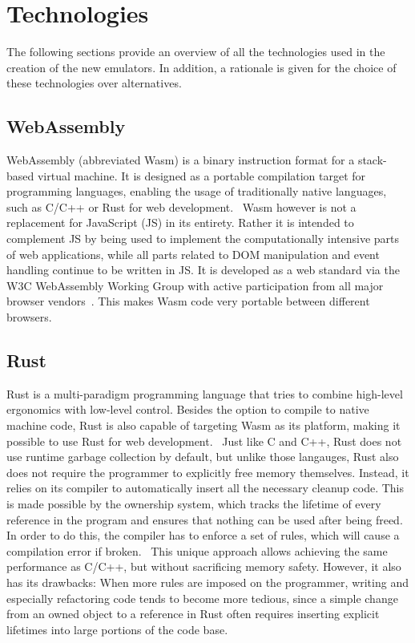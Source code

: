 \section {Technologies}
The following sections provide an overview of all the technologies used in the creation of the new emulators.
In addition, a rationale is given for the choice of these technologies over alternatives.

\subsection{WebAssembly}
WebAssembly (abbreviated Wasm) is a binary instruction format for a stack-based virtual machine. It is designed as a portable compilation target for programming languages, enabling the usage of traditionally native languages, such as C/C++ or Rust for web development.~\cite{wasmweb}
Wasm however is not a replacement for JavaScript (JS) in its entirety. Rather it is intended to complement JS by being used to implement the computationally intensive parts of web applications, while all parts related to DOM manipulation and event handling continue to be written in JS. It is developed as a web standard via the W3C WebAssembly Working Group with active participation from all major browser vendors~\cite{wasmmdn}.
This makes Wasm code very portable between different browsers.

\subsection{Rust}
Rust is a multi-paradigm programming language that tries to combine high-level ergonomics with low-level control. \cite[Introduction]{klabnik2019rust}
Besides the option to compile to native machine code, Rust is also capable of targeting Wasm as its platform, making it possible to use Rust for web development.~\cite{rustwasm}
Just like C and C++, Rust does not use runtime garbage collection by default, but unlike those langauges, Rust also does not require the programmer to explicitly free memory themselves.
Instead, it relies on its compiler to automatically insert all the necessary cleanup code. This is made possible by the ownership system, which tracks the lifetime of every reference in the program and ensures that nothing can be used after being freed.
In order to do this, the compiler has to enforce a set of rules, which will cause a compilation error if broken.~\cite[Chapter~4]{klabnik2019rust}
This unique approach allows achieving the same performance as C/C++, but without sacrificing memory safety.
However, it also has its drawbacks: When more rules are imposed on the programmer, writing and especially refactoring code tends to become more tedious, since a simple change from an owned object to a reference in Rust often requires inserting explicit lifetimes into large portions of the code base.

